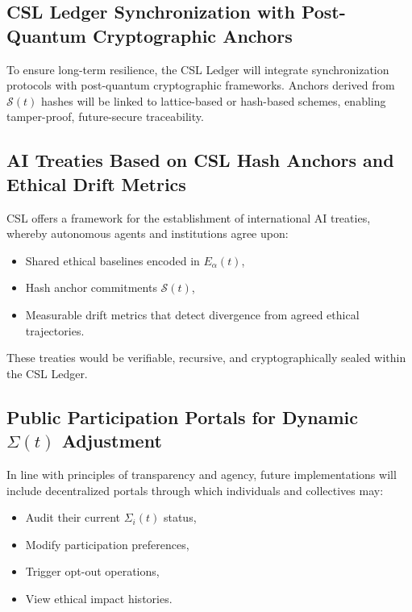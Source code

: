 \documentclass[12pt]{article}
\begin{document}
\begin{itemize}
\subsection{CSL Ledger Synchronization with Post-Quantum Cryptographic Anchors}

To ensure long-term resilience, the CSL Ledger will integrate synchronization protocols with post-quantum cryptographic frameworks. Anchors derived from \(\mathcal{S}(t)\) hashes will be linked to lattice-based or hash-based schemes, enabling tamper-proof, future-secure traceability.

\subsection{AI Treaties Based on CSL Hash Anchors and Ethical Drift Metrics}

CSL offers a framework for the establishment of international AI treaties, whereby autonomous agents and institutions agree upon:

\begin{itemize}
    \item Shared ethical baselines encoded in \(E_\alpha(t)\),
    \item Hash anchor commitments \(\mathcal{S}(t)\),
    \item Measurable drift metrics that detect divergence from agreed ethical trajectories.
\end{itemize}

These treaties would be verifiable, recursive, and cryptographically sealed within the CSL Ledger.

\subsection{Public Participation Portals for Dynamic \(\Sigma(t)\) Adjustment}

In line with principles of transparency and agency, future implementations will include decentralized portals through which individuals and collectives may:

\begin{itemize}
    \item Audit their current \(\Sigma_i(t)\) status,
    \item Modify participation preferences,
    \item Trigger opt-out operations,
    \item View ethical impact histories.
\end{itemize}


\end{itemize}
\end{document}
